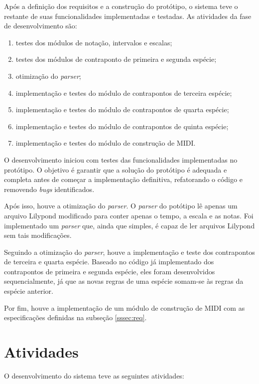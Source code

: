     Após a definição dos requisitos e a construção do protótipo, o sistema teve o restante de suas funcionalidades implementadas e testadas. As atividades da fase de desenvolvimento são:

    \begin{enumerate}
      \item testes dos módulos de notação, intervalos e escalas;
      \item testes dos módulos de contraponto de primeira e segunda espécie;
      \item otimização do \textit{parser};
      \item implementação e testes do módulo de contrapontos de terceira espécie;
      \item implementação e testes do módulo de contrapontos de quarta espécie;
      \item implementação e testes do módulo de contrapontos de quinta espécie;
      \item implementação e testes do módulo de construção de MIDI.
    \end{enumerate}

    O desenvolvimento iniciou com testes das funcionalidades implementadas no protótipo. O objetivo é garantir que a solução do protótipo é adequada e completa antes de começar a implementação definitiva, refatorando o código e removendo \textit{bugs} identificados.

    Após isso, houve a otimização do \textit{parser}. O \textit{parser} do potótipo lê apenas um arquivo Lilypond modificado para conter apenas o tempo, a escala e as notas. Foi implementado um \textit{parser} que, ainda que simples, é capaz de ler arquivos Lilypond sem tais modificações.

    Seguindo a otimização do \textit{parser}, houve a implementação e teste dos contrapontos de terceira e quarta espécie. Baseado no código já implementado dos contrapontos de primeira e segunda espécie, eles foram desenvolvidos sequencialmente, já que as novas regras de uma espécie somam-se às regras da espécie anterior.

    Por fim, houve a implementação de um módulo de construção de MIDI com as especificações definidas na subseção \ref{sssec:req}.

  \section[Atividades]{Atividades}

  O desenvolvimento do sistema teve as seguintes atividades:

